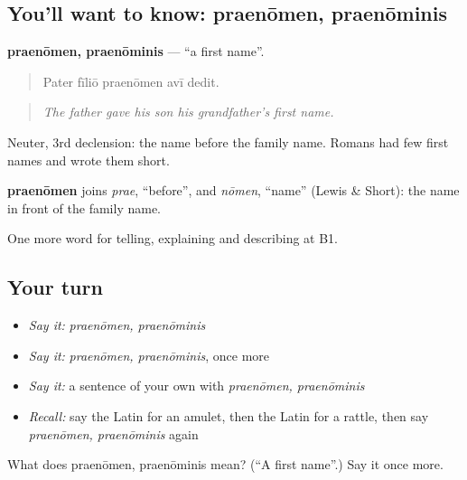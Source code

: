 \subsection*{You'll want to know: praenōmen, praenōminis}
\textbf{praenōmen, praenōminis} — \textquotedblleft{}a first name\textquotedblright{}.

\begin{quote}
Pater fīliō praenōmen avī dedit.
\end{quote}

\begin{quote}
\emph{The father gave his son his grandfather's first name.}
\end{quote}

Neuter, 3rd declension: the name before the family name. Romans had few first names and wrote them short.

\begin{cousinweb}
\textbf{praenōmen} joins \emph{prae}, \textquotedblleft{}before\textquotedblright{}, and \emph{nōmen}, \textquotedblleft{}name\textquotedblright{} (Lewis \& Short): the name in front of the family name.
\end{cousinweb}

\begin{grammarlens}[title={What you've built}]
One more word for telling, explaining and describing at B1.
\end{grammarlens}

\subsection*{Your turn}
\begin{itemize}
\raggedright
  \item \emph{Say it:} \emph{praenōmen, praenōminis}
  \item \emph{Say it:} \emph{praenōmen, praenōminis}, once more
  \item \emph{Say it:} a sentence of your own with \emph{praenōmen, praenōminis}
  \item \emph{Recall:} say the Latin for an amulet, then the Latin for a rattle, then say \emph{praenōmen, praenōminis} again
\end{itemize}

\begin{tcolorbox}[breakable,colback=teal!4,colframe=teal!35!black,title={Before you move on}]
What does praenōmen, praenōminis mean? (\textquotedblleft{}A first name\textquotedblright{}.) Say it once more.
\end{tcolorbox}

